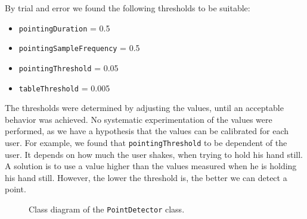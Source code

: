 By trial and error we found the following thresholds to be suitable:

\begin{itemize}
\item \texttt{pointingDuration} = \num{0.5}
\item \texttt{pointingSampleFrequency} = \num{0.5}
\item \texttt{pointingThreshold} = \num{0.05}
\item \texttt{tableThreshold} = \num{0.005}
\end{itemize}

The thresholds were determined by adjusting the values, 
until an acceptable behavior was achieved. 
No systematic experimentation of the values were performed, 
as we have a hypothesis that the values can be calibrated for each user. 
For example, we found that \texttt{pointingThreshold} to be dependent of the user. 
It depends on how much the user shakes, 
when trying to hold his hand still. 
A solution is to use a value higher than the values measured when he is holding his hand still.
However, the lower the threshold is, 
the better we can detect a point.

\begin{figure}
  \centering
  \caption{Class diagram of the \texttt{PointDetector} class.}
  \label{fig:pointdetector-uml}
\end{figure}

